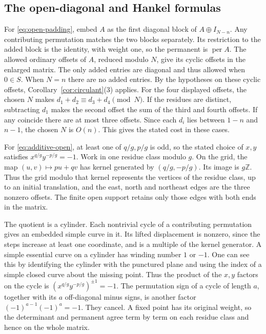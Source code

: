 \documentclass[11pt,reqno]{amsart}
\theoremstyle{remark}
\numberwithin{equation}{section}
\newcommand{\per}{\operatorname{per}}
\begin{document}
\subsection{The open-diagonal and Hankel formulas}

For \eqref{eq:open-padding}, embed \(A\) as the first diagonal block of
\(A\oplus I_{N-n}\). Any contributing permutation matches the two blocks
separately. Its restriction to the added block is the identity, with
weight one, so the permanent is \(\per A\). The allowed ordinary offsets
of \(A\), reduced modulo \(N\), give its cyclic offsets in the enlarged
matrix. The only added entries are diagonal and thus allowed when \(0\in
S\). When \(N=n\) there are no added entries. By the hypotheses on these
cyclic offsets, Corollary~\ref{cor:circulant}(3) applies. For the four
displayed offsets, the chosen \(N\) makes \(d_1+d_2\equiv d_3+d_4\pmod
N\). If the residues are distinct, subtracting \(d_1\) makes the second
offset the sum of the third and fourth offsets. If any coincide there are
at most three offsets. Since each \(d_i\) lies between \(1-n\) and
\(n-1\), the chosen \(N\) is \(O(n)\). This gives the stated cost in
these cases.

For \eqref{eq:additive-open}, at least one of \(q/g,p/g\) is odd, so the
stated choice of \(x,y\) satisfies \(x^{q/g}y^{-p/g}=-1\). Work in one
residue class modulo \(g\). On the grid, the map \((u,v)\mapsto pu+qv\)
has kernel generated by \((q/g,-p/g)\). Its image is \(g\mathbb Z\). Thus
the grid modulo that kernel represents the vertices of the residue class,
up to an initial translation, and the east, north and northeast edges are
the three nonzero offsets. The finite open support retains only those
edges with both ends in the matrix.

The quotient is a cylinder. Each nontrivial cycle of a contributing
permutation gives an embedded simple curve in it. Its lifted displacement
is nonzero, since the steps increase at least one coordinate, and is a
multiple of the kernel generator. A simple essential curve on a cylinder
has winding number \(1\) or \(-1\). One can see this by identifying the
cylinder with the punctured plane and using the index of a simple closed
curve about the missing point. Thus the product of the \(x,y\) factors on
the cycle is \((x^{q/g}y^{-p/g})^{\pm1}=-1\). The permutation sign of a
cycle of length \(a\), together with its \(a\) off-diagonal minus signs,
is another factor \((-1)^{a-1}(-1)^a=-1\). They cancel. A fixed point has
its original weight, so the determinant and permanent agree term by term
on each residue class and hence on the whole matrix.
\end{document}
